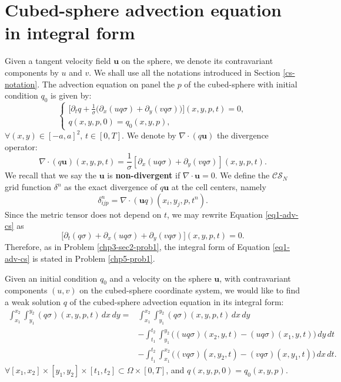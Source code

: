 \section{Cubed-sphere advection equation in integral form}
\label{chp-cs-adv}
Given a tangent velocity field $\boldsymbol{u}$ on the sphere, we denote its
contravariant components by ${u}$ and ${v}$.
We shall use all the notations introduced in Section \ref{cs-notation}.
The advection equation on panel the $p$ of the cubed-sphere with initial condition $q_0$ is given by:
\begin{equation}
	\begin{cases}
	\label{eq1-adv-cs}
	\bigg[{\partial}_t{q}+
	\frac{1}{\sigma}\bigg(
	{\partial}_x{({u} q \sigma)}+
	{\partial}_y{({v} q \sigma)}
	\bigg)\bigg](x,y,p,t)
	= 0,\\
	q(x,y,p,0) = q_0(x,y,p),
	\end{cases}
\end{equation}
$\forall (x,y) \in [-a,a]^2$, $t\in[0,T]$.
We denote by $\nabla \cdot (q\boldsymbol{u})$ the divergence operator:
\begin{equation}
	\label{advcs:eqdiv}
	\nabla \cdot (q\boldsymbol{u})(x, y, p, t) =  \frac{1}{\sigma}
	[{\partial_x (uq\sigma)} + {\partial_y (vq\sigma)}](x, y, p, t).
\end{equation}
We recall that we say the $\boldsymbol{u}$ is \textbf{non-divergent} if $\nabla \cdot \boldsymbol{u}=0$.
We define the $\mathcal{CS}_N$ grid function $\delta^n$ as
the exact divergence of $q\boldsymbol{u}$ at the cell centers, namely
\begin{equation}
	\label{cs-discrete-div}
	\delta^n_{ijp} = \nabla \cdot (\boldsymbol{u}q)(x_i,y_j,p,t^n).
\end{equation}
Since the metric tensor does not depend on $t$, we may rewrite Equation \eqref{eq1-adv-cs} as
\begin{equation}
	\label{eq2-adv-cs}
	\bigg[{\partial}_t{(q \sigma)}+
	{\partial}_x{({u}q \sigma)}+
	{\partial}_y{({v}q \sigma)}
	\bigg](x,y,p,t)
	= 0.
\end{equation}
Therefore, as in Problem \eqref{chp3-sec2-prob1}, the integral form of Equation \eqref{eq1-adv-cs}
is stated in Problem \eqref{chp5-prob1}.
\begin{prob}
	\label{chp5-prob1}
	Given an initial condition ${q}_0$ and
	a velocity on the sphere $\boldsymbol{u}$, with contravariant components $(u,v)$ on the cubed-sphere coordinate system,
	we would like to find a weak solution ${q}$
	of the cubed-sphere advection equation in its integral form:
	\begin{align*}
		\int_{x_1}^{x_2} \int_{y_1}^{y_2}
		{(q\sigma)}(x, y, p, t) \,dx \,dy = &\int_{x_1}^{x_2} \int_{y_1}^{y_2}
		{(q\sigma)}(x, y, p, t) \,dx \,dy \\ \nonumber
		&-\int_{t_1}^{t_2} \int_{y_1}^{y_2} \bigg({(uq\sigma)}(x_2, y, t)
		-{(uq\sigma)}(x_1, y, t) \bigg) \,dy \,dt\\ \nonumber
		&-\int_{t_1}^{t_2} \int_{x_1}^{x_2} \bigg({(vq\sigma)}(x, y_2, t)
		-{(vq\sigma)}(x, y_1, t) \bigg) \,dx \,dt.
	\end{align*}
	$\forall [x_1, x_2]\times [y_1, y_2] \times[t_1, t_2] \subset \Omega \times[0,T]$, and
	$q(x,y,p,0)=q_0(x,y,p)$.
\end{prob}
